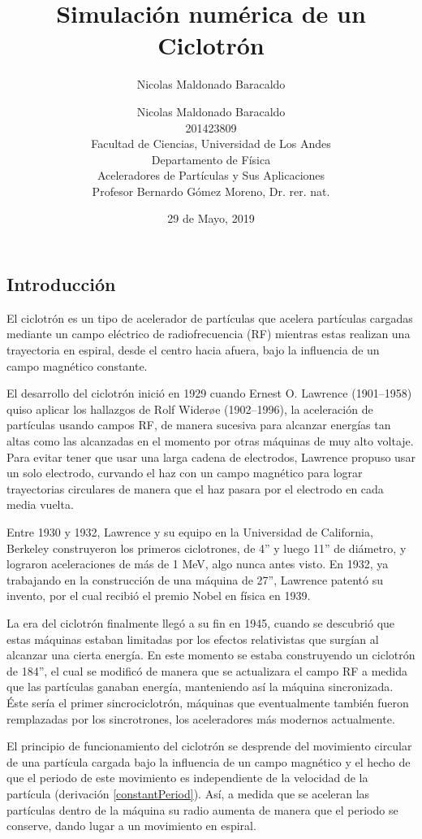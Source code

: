 \documentclass[letterpaper, 11pt]{article}
\title{Simulación numérica de un Ciclotrón}
\author{Nicolas Maldonado Baracaldo}
\author{
Nicolas Maldonado Baracaldo\\
201423809\\
Facultad de Ciencias, Universidad de Los Andes\\
Departamento de Física\\
Aceleradores de Partículas y Sus Aplicaciones\\
Profesor Bernardo Gómez Moreno, Dr. rer. nat.
}
\date{29 de Mayo, 2019}
\begin{document}
\maketitle

\begin{multicols}{2}

\section{Introducción}
El ciclotrón es un tipo de acelerador de partículas que acelera partículas cargadas mediante un campo eléctrico de radiofrecuencia (RF) mientras estas realizan una trayectoria en espiral, desde el centro hacia afuera, bajo la influencia de un campo magnético constante.

El desarrollo del ciclotrón inició en 1929 cuando Ernest O. Lawrence (1901--1958) quiso aplicar los hallazgos de Rolf Widerøe (1902--1996), la aceleración de partículas usando campos RF, de manera sucesiva para alcanzar energías tan altas como las alcanzadas en el momento por otras máquinas de muy alto voltaje. Para evitar tener que usar una larga cadena de electrodos, Lawrence propuso usar un solo electrodo, curvando el haz con un campo magnético para lograr trayectorias circulares de manera que el haz pasara por el electrodo en cada media vuelta.

Entre 1930 y 1932, Lawrence y su equipo en la Universidad de California, Berkeley construyeron los primeros ciclotrones, de 4'' y luego 11'' de diámetro, y lograron aceleraciones de más de 1 MeV, algo nunca antes visto. En 1932, ya trabajando en la construcción de una máquina de 27'', Lawrence patentó su invento, por el cual recibió el premio Nobel en física en 1939.

La era del ciclotrón finalmente llegó a su fin en 1945, cuando se descubrió que estas máquinas estaban limitadas por los efectos relativistas que surgían al alcanzar una cierta energía. En este momento se estaba construyendo un ciclotrón de 184'', el cual se modificó de manera que se actualizara el campo RF a medida que las partículas ganaban energía, manteniendo así la máquina sincronizada. Éste sería el primer sincrociclotrón, máquinas que eventualmente también fueron remplazadas por los sincrotrones, los aceleradores más modernos actualmente.

El principio de funcionamiento del ciclotrón se desprende del movimiento circular de una partícula cargada bajo la influencia de un campo magnético y el hecho de que el periodo de este movimiento es independiente de la velocidad de la partícula (derivación \ref{constantPeriod}). Así, a medida que se aceleran las partículas dentro de la máquina su radio aumenta de manera que el periodo se conserve, dando lugar a un movimiento en espiral.


\end{multicols}
\end{document}
